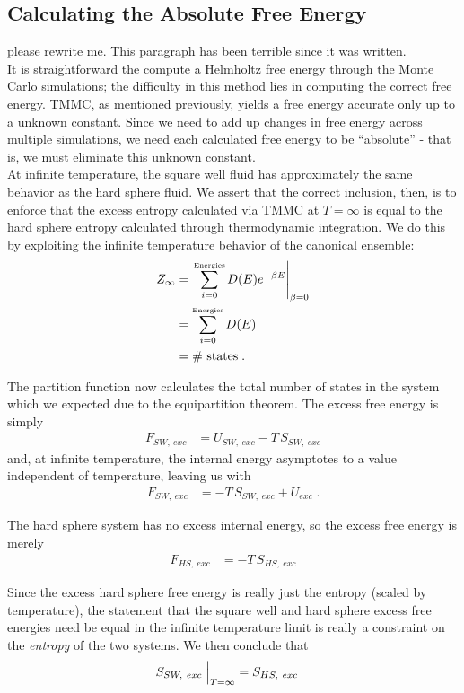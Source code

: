 \documentclass[12pt]{article}
\begin{document}
\subsection{Calculating the Absolute Free Energy}
{\color{red} please rewrite me. This paragraph has been terrible since it was written.}\\
It is straightforward the compute a Helmholtz free energy through the Monte Carlo simulations; the difficulty in this method lies in computing the correct free energy. TMMC, as mentioned previously, yields a free energy accurate only up to a unknown constant. Since we need to add up changes in free energy across multiple simulations, we need each calculated free energy to be ``absolute'' - that is, we must eliminate this unknown constant. \\

At infinite temperature, the square well fluid has approximately the same behavior as the hard sphere fluid.  We assert that the correct inclusion, then, is to enforce that the excess entropy calculated via TMMC at $T=\infty$ is equal to the hard sphere entropy calculated through thermodynamic integration. We do this by exploiting the infinite temperature behavior of the canonical ensemble:
\begin{align}
    Z_{\infty} &= \left.\sum_{i=0}^{\text{\tiny Energies}} D(E) e^{-\beta E}\right|_{\beta = 0}\\
    &= \sum_{i=0}^{\text{\tiny Energies}} D(E)\\
    &= \#\text{~states}\;.
\end{align}

The partition function now calculates the total number of states in the system which we expected due to the equipartition theorem. The excess free energy is simply
\begin{align}
    F_{SW,~exc} &= U_{SW,~exc} - T\,S_{SW,~exc}     
\end{align} 
and, at infinite temperature, the internal energy asymptotes to a value independent of temperature, leaving us with
\begin{align}
    F_{SW,~exc} &= -T\,S_{SW, ~exc} + U_{exc}\;.
\end{align}

The hard sphere system has no excess internal energy, so the excess free energy is merely
\begin{align}
     F_{HS,~exc} &= -T\,S_{HS,~exc} 
\end{align} 

Since the excess hard sphere free energy is really just the entropy \cite{valeskethesis} (scaled by temperature), the statement that the square well and hard sphere excess free energies need be equal in the infinite temperature limit is really a constraint on the {\it entropy} of the two systems. We then conclude that
\begin{align}
    S_{SW,~exc} \Bigm\lvert_{T=\infty} &= S_{HS,~exc}
\end{align}
\end{document}
